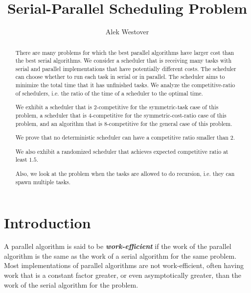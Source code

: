 \documentclass[twocolumn]{article}[10pt]
\author{Alek Westover}
\title{Serial-Parallel Scheduling Problem}
\newcommand{\defn}[1]{{\textit{\textbf{\boldmath #1}}}\xspace}
\begin{document}
\maketitle

\begin{abstract}
  There are many problems for which the best parallel algorithms
  have larger cost than the best serial algorithms. 
  We consider a scheduler that is receiving many tasks with
  serial and parallel implementations that have potentially
  different costs. The scheduler can choose whether to run each
  task in serial or in parallel.
  The scheduler aims to minimize the total time that it has
  unfinished tasks. We analyze the competitive-ratio of
  schedulers, i.e. the ratio of the time of a scheduler to the
  optimal time.

  We exhibit a scheduler that is $2$-competitive for the
  symmetric-task case of this problem, a scheduler that is
  $4$-competitive for the symmetric-cost-ratio case of this
  problem, and an algorithm that is $8$-competitive for the
  general case of this problem.

  We prove that no deterministic scheduler can have a competitive
  ratio smaller than $2$.

  We also exhibit a randomized scheduler that achieves
  expected competitive ratio at least $1.5$.

  Also, we look at the problem when the tasks are allowed to do
  recursion, i.e. they can spawn multiple tasks.

\end{abstract}

\section{Introduction}
A parallel algorithm is said to be \defn{work-efficient} if the
work of the parallel algorithm is the same as the work of a
serial algorithm for the same problem. Most implementations of
parallel algorithms are not work-efficient, often having work
that is a constant factor greater, or even asymptotically
greater, than the work of the serial algorithm for the problem.
\end{document}
